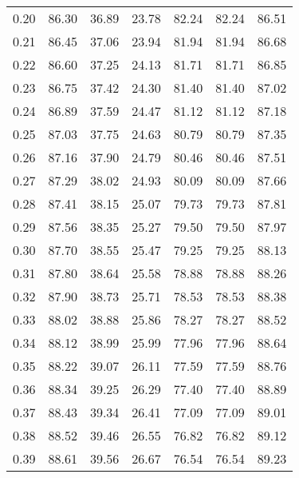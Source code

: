 \begin{tabular}{|c|c|c|c|c|c|c|}
      0.20 &     86.30 &     36.89 &      23.78 &   82.24 &      82.24 &         86.51 \\
      0.21 &     86.45 &     37.06 &      23.94 &   81.94 &      81.94 &         86.68 \\
      0.22 &     86.60 &     37.25 &      24.13 &   81.71 &      81.71 &         86.85 \\
      0.23 &     86.75 &     37.42 &      24.30 &   81.40 &      81.40 &         87.02 \\
      0.24 &     86.89 &     37.59 &      24.47 &   81.12 &      81.12 &         87.18 \\
      0.25 &     87.03 &     37.75 &      24.63 &   80.79 &      80.79 &         87.35 \\
      0.26 &     87.16 &     37.90 &      24.79 &   80.46 &      80.46 &         87.51 \\
      0.27 &     87.29 &     38.02 &      24.93 &   80.09 &      80.09 &         87.66 \\
      0.28 &     87.41 &     38.15 &      25.07 &   79.73 &      79.73 &         87.81 \\
      0.29 &     87.56 &     38.35 &      25.27 &   79.50 &      79.50 &         87.97 \\
      0.30 &     87.70 &     38.55 &      25.47 &   79.25 &      79.25 &         88.13 \\
      0.31 &     87.80 &     38.64 &      25.58 &   78.88 &      78.88 &         88.26 \\
      0.32 &     87.90 &     38.73 &      25.71 &   78.53 &      78.53 &         88.38 \\
      0.33 &     88.02 &     38.88 &      25.86 &   78.27 &      78.27 &         88.52 \\
      0.34 &     88.12 &     38.99 &      25.99 &   77.96 &      77.96 &         88.64 \\
      0.35 &     88.22 &     39.07 &      26.11 &   77.59 &      77.59 &         88.76 \\
      0.36 &     88.34 &     39.25 &      26.29 &   77.40 &      77.40 &         88.89 \\
      0.37 &     88.43 &     39.34 &      26.41 &   77.09 &      77.09 &         89.01 \\
      0.38 &     88.52 &     39.46 &      26.55 &   76.82 &      76.82 &         89.12 \\
      0.39 &     88.61 &     39.56 &      26.67 &   76.54 &      76.54 &         89.23 \\

\end{tabular}
